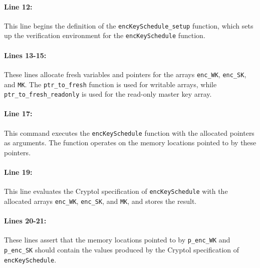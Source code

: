 \documentclass{article}
\begin{document}
    \paragraph{Line 12:} 
    This line begins the definition of the \texttt{encKeySchedule\_setup} function, which sets up the verification environment for the \texttt{encKeySchedule} function.
    
    \paragraph{Lines 13-15:} 
    These lines allocate fresh variables and pointers for the arrays \texttt{enc\_WK}, \texttt{enc\_SK}, and \texttt{MK}. The \texttt{ptr\_to\_fresh} function is used for writable arrays, while \texttt{ptr\_to\_fresh\_readonly} is used for the read-only master key array.
    
    \paragraph{Line 17:} 
    This command executes the \texttt{encKeySchedule} function with the allocated pointers as arguments. The function operates on the memory locations pointed to by these pointers.
    
    \paragraph{Line 19:} 
    This line evaluates the Cryptol specification of \texttt{encKeySchedule} with the allocated arrays \texttt{enc\_WK}, \texttt{enc\_SK}, and \texttt{MK}, and stores the result.
    
    \paragraph{Lines 20-21:} 
    These lines assert that the memory locations pointed to by \texttt{p\_enc\_WK} and \texttt{p\_enc\_SK} should contain the values produced by the Cryptol specification of \texttt{encKeySchedule}.
    
\end{document}
